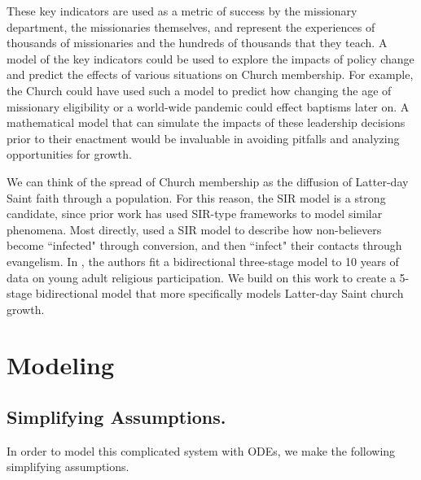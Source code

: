 \documentclass[11pt]{amsart}
\begin{document}
These key indicators are used as a metric of success by the missionary department, the missionaries themselves, and represent the experiences of thousands of missionaries and the hundreds of thousands that they teach. A model of the key indicators could be used to explore the impacts of policy change and predict the effects of various situations on Church membership. For example, the Church could have used such a model to predict how changing the age of missionary eligibility or a world-wide pandemic could effect baptisms later on. A mathematical model that can simulate the impacts of these leadership decisions prior to their enactment would be invaluable in avoiding pitfalls and analyzing opportunities for growth. 

We can think of the spread of Church membership as the diffusion of Latter-day Saint faith through a population. For this reason, the SIR model is a strong candidate, since prior work has used SIR-type frameworks to model similar phenomena. Most directly, \cite{hayward1995church} used a SIR model to describe how non-believers become ``infected" through conversion, and then ``infect" their contacts through evangelism. In \cite{koval2023social}, the authors fit a bidirectional three-stage model to 10 years of data on young adult religious participation. We build on this work to create a 5-stage bidirectional model that more specifically models Latter-day Saint church growth.

\section{Modeling}

\subsection*{Simplifying Assumptions.}
\begin{center}
\hspace{0pt}
\end{center}

In order to model this complicated system with ODEs, we make the following simplifying assumptions.
\end{document}
